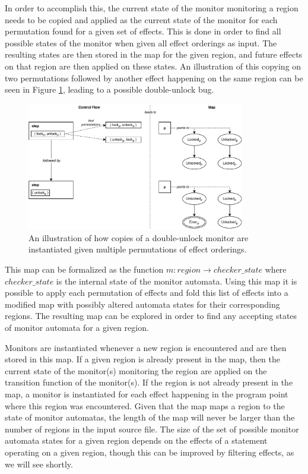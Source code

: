 \newpar In order to accomplish this, the current state of the monitor monitoring a region needs to be copied and applied as the current state of the monitor for each permutation found for a given set of effects.  This is done in order to find all possible states of the monitor when given all effect orderings as input. The resulting states are then stored in the map for the given region, and future effects on that region are then applied on these states. An illustration of this copying on two permutations followed by another effect happening on the same region can be seen in Figure \ref{permutation-copy}, leading to a possible double-unlock bug.

\begin{figure}[H]
    \centering
    \includegraphics[width=0.85\textwidth]{implementation/figures/permutation-copy}
    \caption{An illustration of how copies of a double-unlock monitor are instantiated given multiple permutations of effect orderings.}
    \label{permutation-copy}
\end{figure}

\newpar This map can be formalized as the function $m: region \rightarrow { checker\_state }$ where $ checker\_state $ is the internal state of the monitor automata. Using this map it is possible to apply each permutation of effects and fold this list of effects into a modified map with possibly altered automata states for their corresponding regions. The resulting map can be explored in order to find any accepting states of monitor automata for a given region. 

\newpar Monitors are instantiated whenever a new region is encountered and are then stored in this map. If a given region is already present in the map, then the current state of the monitor(s) monitoring the region are applied on the transition function of the monitor(s). If the region is not already present in the map, a monitor is instantiated for each effect happening in the program point where this region was encountered. Given that the map maps a region to the state of monitor automatas, the length of the map will never be larger than the number of regions in the input source file. The size of the set of possible monitor automata states for a given region depends on the effects of a statement operating on a given region, though this can be improved by filtering effects, as we will see shortly. 

